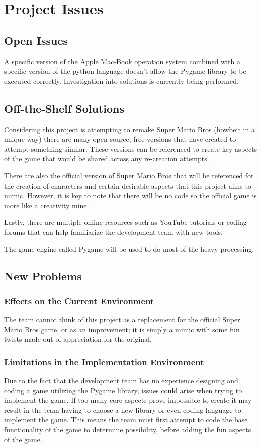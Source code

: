 \documentclass[12pt, titlepage]{article}
\begin{document}
\section{Project Issues}

\subsection{Open Issues}
A specific version of the Apple Mac-Book operation system combined with a specific version of the python language doesn't allow the Pygame library to be executed correctly. Investigation into solutions is currently being performed.

\subsection{Off-the-Shelf Solutions}
Considering this project is attempting to remake Super Mario Bros (howbeit in a unique way) there are many open source, free versions that have created to attempt something similar. These versions can be referenced to create key aspects of the game that would be shared across any re-creation attempts.

There are also the official version of Super Mario Bros that will be referenced for the creation of characters and certain desirable aspects that this project aims to mimic. However, it is key to note that there will be no code so the official game is more like a creativity mine.

Lastly, there are multiple online resources such as YouTube tutorials or coding forums that can help familiarize the development team with new tools.

The game engine called Pygame will be used to do most of the heavy processing.

\subsection{New Problems}
\subsubsection{Effects on the Current Environment}
The team cannot think of this project as a replacement for the official Super Mario Bros game, or as an improvement; it is simply a mimic with some fun twists made out of appreciation for the original.

\subsubsection{Limitations in the Implementation Environment}
Due to the fact that the development team has no experience designing and coding a game utilizing the Pygame library, issues could arise when trying to implement the game. If too many core aspects prove impossible to create it may result in the team having to choose a new library or even coding language to implement the game. This means the team must first attempt to code the base functionality of the game to determine possibility, before adding the fun aspects of the game.
\end{document}
